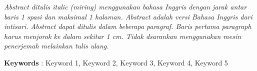 \textit{
	Abstract ditulis italic (miring) menggunakan bahasa Inggris dengan jarak antar baris 1 spasi dan maksimal 1 halaman. Abstract adalah versi Bahasa Inggris dari intisari. Abstract dapat ditulis dalam beberapa paragraf. Baris pertama paragraph harus menjorok ke dalam sekitar 1 cm. Tidak dsarankan menggunakan mesin penerjemah melainkan tulis ulang.
}

\noindent\textbf{Keywords} : Keyword 1, Keyword 2, Keyword 3, Keyword 4, Keyword 5